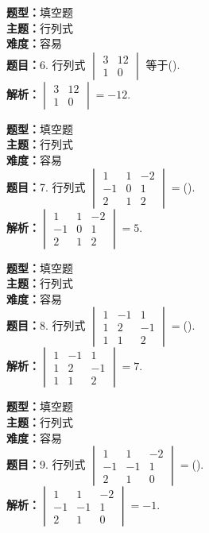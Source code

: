 \documentclass{ctexart}
\newenvironment{question}[5]{%
	\noindent\textbf{题型：}#1\\
	\textbf{主题：}#2\\
	\textbf{难度：}#3\\
	\textbf{题目：}#4\\
	\textbf{解析：}#5\\
	\vspace{1em}
}{}
\begin{document}
	\begin{question}
		{填空题}
		{行列式}
		{容易}
		{6. 行列式 \(\begin{vmatrix} 3 & 12 \\ 1 & 0\end{vmatrix}\) 等于(\qquad). }
		{\(\begin{vmatrix} 3 & 12 \\ 1 & 0\end{vmatrix}=-12\).}
	\end{question}
	
	\begin{question}
		{填空题}
		{行列式}
		{容易}
		{7. 行列式 \(\begin{vmatrix} 1 & 1 & -2 \\ -1 & 0 & 1 \\ 2 & 1 & 2\end{vmatrix}=\)(\qquad). }
		{\(\begin{vmatrix} 1 & 1 & -2 \\ -1 & 0 & 1 \\ 2 & 1 & 2\end{vmatrix}=5\).}
	\end{question}
	
	\begin{question}
		{填空题}
		{行列式}
		{容易}
		{8. 行列式 \(\begin{vmatrix} 1 & -1 & 1 \\ 1 & 2 & -1 \\ 1 & 1 & 2\end{vmatrix}=\)(\qquad). }
		{\(\begin{vmatrix} 1 & -1 & 1 \\ 1 & 2 & -1 \\ 1 & 1 & 2\end{vmatrix}=7\).}
	\end{question}
	
	\begin{question}
		{填空题}
		{行列式}
		{容易}
		{9. 行列式 \(\begin{vmatrix} 1 & 1 & -2 \\ -1 & -1 & 1 \\ 2 & 1 & 0\end{vmatrix}=\)(\qquad). }
		{\(\begin{vmatrix} 1 & 1 & -2 \\ -1 & -1 & 1 \\ 2 & 1 & 0\end{vmatrix}=-1\).}
	\end{question}
	
\end{document}
